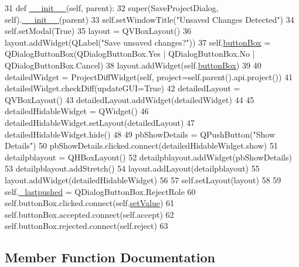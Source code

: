 \begin{DoxyCode}
31     \textcolor{keyword}{def }\hyperlink{classsoftware_1_1chipwhisperer_1_1common_1_1ui_1_1saveproject_1_1SaveProjectDialog_a74ed4268ea7f95d176a10f7ecf35b11a}{\_\_init\_\_}(self, parent):
32         super(SaveProjectDialog, self).\hyperlink{classsoftware_1_1chipwhisperer_1_1common_1_1ui_1_1saveproject_1_1SaveProjectDialog_a74ed4268ea7f95d176a10f7ecf35b11a}{\_\_init\_\_}(parent)
33         self.setWindowTitle(\textcolor{stringliteral}{"Unsaved Changes Detected"})
34         self.setModal(\textcolor{keyword}{True})
35         layout = QVBoxLayout()
36         layout.addWidget(QLabel(\textcolor{stringliteral}{"Save unsaved changes?"}))
37         self.\hyperlink{classsoftware_1_1chipwhisperer_1_1common_1_1ui_1_1saveproject_1_1SaveProjectDialog_ac079729687f3f5327de93bf1585de65c}{buttonBox} = QDialogButtonBox(QDialogButtonBox.Yes | QDialogButtonBox.No | 
      QDialogButtonBox.Cancel)
38         layout.addWidget(self.\hyperlink{classsoftware_1_1chipwhisperer_1_1common_1_1ui_1_1saveproject_1_1SaveProjectDialog_ac079729687f3f5327de93bf1585de65c}{buttonBox})
39 
40         detailedWidget = ProjectDiffWidget(self, project=self.parent().api.project())
41         detailedWidget.checkDiff(updateGUI=\textcolor{keyword}{True})
42         detailedLayout = QVBoxLayout()
43         detailedLayout.addWidget(detailedWidget)
44 
45         detailedHidableWidget = QWidget()
46         detailedHidableWidget.setLayout(detailedLayout)
47         detailedHidableWidget.hide()
48 
49         pbShowDetails = QPushButton(\textcolor{stringliteral}{"Show Details"})
50         pbShowDetails.clicked.connect(detailedHidableWidget.show)
51         detailpblayout = QHBoxLayout()
52         detailpblayout.addWidget(pbShowDetails)
53         detailpblayout.addStretch()
54         layout.addLayout(detailpblayout)
55         layout.addWidget(detailedHidableWidget)
56 
57         self.setLayout(layout)
58 
59         self.\hyperlink{classsoftware_1_1chipwhisperer_1_1common_1_1ui_1_1saveproject_1_1SaveProjectDialog_a3e5ff96fb08d151715449f76ff83bf35}{\_lastpushed} = QDialogButtonBox.RejectRole
60         self.buttonBox.clicked.connect(self.\hyperlink{classsoftware_1_1chipwhisperer_1_1common_1_1ui_1_1saveproject_1_1SaveProjectDialog_ac8d30703920421b5084bdd8212751a4b}{setValue})
61         self.buttonBox.accepted.connect(self.accept)
62         self.buttonBox.rejected.connect(self.reject)
63 
\end{DoxyCode}


\subsection{Member Function Documentation}
\hypertarget{classsoftware_1_1chipwhisperer_1_1common_1_1ui_1_1saveproject_1_1SaveProjectDialog_a116a2d66274ec2e80c142f8290d48610}{}
